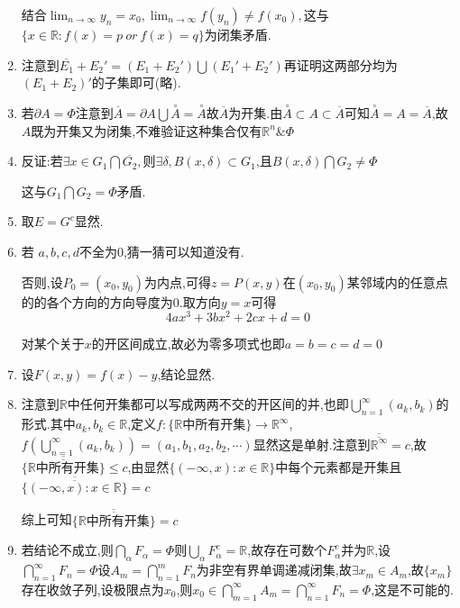 \documentclass[UTF8, a4paper, 12pt, oneside, onecolumn]{article}
\numberwithin{equation}{section}
\numberwithin{figure}{section}
\numberwithin{table}{section}
\theoremstyle{nonumberplain}	%
\theoremstyle{plain}	%
\theoremstyle{plain}	%
\theoremstyle{plain}	%
\theoremstyle{plain}	%
\theoremstyle{nonumberplain}
\begin{document}
\begin{enumerate}
	结合$\displaystyle\lim_{n\rightarrow \infty}y_n=x_0,\lim_{n\rightarrow \infty}f(y_n)\neq f(x_0) ,$这与$\{x\in \mathbb{R}:f(x)=p~or~f(x)=q\}$为闭集矛盾.
	\item 注意到$\overline{E_1}+E_2'=(E_1+E_2')\bigcup(E_1'+E_2')$再证明这两部分均为$(E_1+E_2)'$的子集即可(略).
	
	\item 若$\partial A=\Phi$注意到$\overline{A}=\partial A\bigcup \overset{\circ}{A}=\overset{\circ}{A}$故$\overline{A}$为开集.由$\overset{\circ}{A}\subset A\subset \overline{A}$可知$\overset{\circ}{A}= A= \overline{A}$,故$A$既为开集又为闭集,不难验证这种集合仅有$\mathbb{R}^n\&\Phi$
	
	\item 反证:若$\exists x\in G_1\bigcap \overline{G_2},$则$\exists \delta,B(x,\delta)\subset G_1$,且$B(x,\delta)\bigcap G_2\neq \Phi$
	
	这与$G_1\bigcap G_2=\Phi$矛盾.
	
	\item 取$E=G^c$显然.
	
	\item 若 $a,b,c,d$不全为0,猜一猜可以知道没有.
	
	否则,设$P_0=(x_0,y_0)$为内点,可得$z=P(x,y)$在$(x_0,y_0)$某邻域内的任意点的的各个方向的方向导度为0.取方向$y=x$可得
	$$4ax^3+3bx^2+2cx+d=0$$
	
	对某个关于$x$的开区间成立,故必为零多项式也即$a=b=c=d=0$
	
	\item 设$F(x,y)=f(x)-y$,结论显然.
	
	\item 注意到$\mathbb{R}$中任何开集都可以写成两两不交的开区间的并,也即$\displaystyle\bigcup_{n=1}^{\infty}(a_k,b_k)$的形式.其中$a_k,b_k\in \mathbb{R}$,定义$f:\{\mathbb{R}\text{中所有开集}\}\rightarrow \mathbb{R}^{\infty}$,$f(\displaystyle\bigcup_{n=1}^{\infty}(a_k,b_k))=(a_1,b_1,a_2,b_2,\cdots) $显然这是单射.注意到$\overline{\overline{\mathbb{R}^{\infty}}}=c$,故$\overline{\overline{ \{\mathbb{R}\text{中所有开集}\} } }\leqslant c$,由显然$\{(-\infty,x):x\in \mathbb{R}\}$中每个元素都是开集且$\overline{\overline{ \{(-\infty,x):x\in \mathbb{R}\} } }=c$
	
	综上可知$\overline{\overline{ \{\mathbb{R}\text{中所有开集}\} } }=c$
	
	\item 若结论不成立,则$\displaystyle\bigcap_{\alpha}F_{\alpha}=\Phi$则$\displaystyle \bigcup_{\alpha}F_{\alpha}^c=\mathbb{R}$,故存在可数个$\displaystyle F_{\alpha}^c$并为$\mathbb{R}$,设$\displaystyle\bigcap_{n=1}^{\infty}F_n=\Phi$设$\displaystyle A_m=\bigcap_{n=1}^{m}F_n$为非空有界单调递减闭集,故$\exists x_m\in A_m$,故$\{x_m\}$存在收敛子列,设极限点为$x_0$,则$\displaystyle x_0\in \bigcap_{m=1}^{\infty}A_m=\bigcap_{n=1}^{\infty}F_n=\Phi$,这是不可能的.
	

\end{enumerate}
\end{document}
